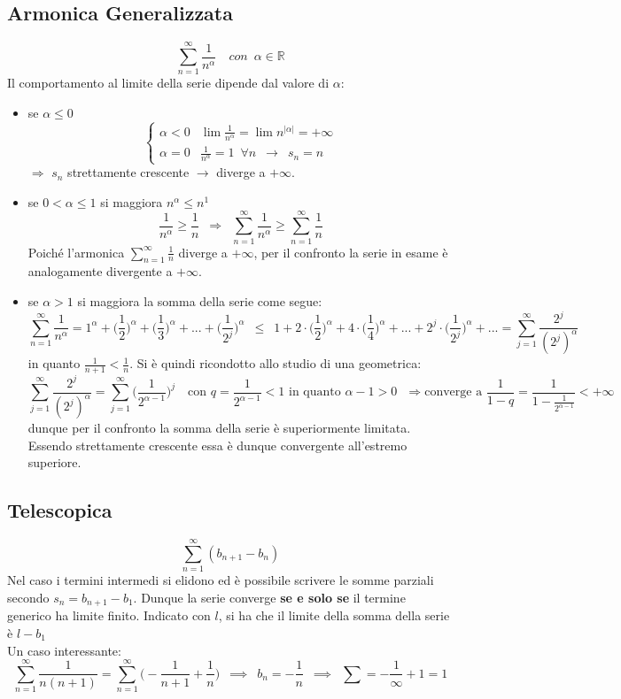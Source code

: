 \documentclass[10pt, oneside]{book}
\theoremstyle{plain}
\begin{document}
\subsection{Armonica Generalizzata}
\[\sum \limits_{n=1}^{\infty} \frac{1}{n^\alpha} \quad con \enspace \alpha \in \mathbb{R}\]
Il comportamento al limite della serie dipende dal valore di $\alpha$:
\begin{itemize}[label=$\ast$]
    \item se $\alpha \leq 0$\\
    \[\begin{cases}
        \alpha < 0 & \lim \frac{1}{n^\alpha} = \lim n^{|\alpha|} = + \infty \\
        \alpha = 0 & \frac{1}{n^\alpha} = 1 \enspace \forall n \enspace \rightarrow \enspace s_n = n
    \end{cases}
    \]
    $\Rightarrow$ $s_n$ strettamente crescente $\rightarrow$ diverge a $+ \infty$.
    \item se $0 < \alpha \leq 1$ si maggiora $n^\alpha \leq n^1$
    \[\frac{1}{n^\alpha} \geq \frac{1}{n} \enspace \Rightarrow \enspace \sum \limits_{n=1}^{\infty} \frac{1}{n^\alpha} \geq \sum \limits_{n=1}^{\infty} \frac{1}{n}\]
    Poiché l'armonica $\sum_{n=1}^{\infty} \frac{1}{n}$ diverge a $+ \infty$, per il confronto la serie in esame è analogamente divergente a $+\infty$.
    \item se $\alpha > 1$ si maggiora la somma della serie come segue:
    \[\sum \limits_{n=1}^{\infty} \frac{1}{n^\alpha} = 1^\alpha + \bigg(\frac{1}{2}\bigg)^\alpha + \bigg(\frac{1}{3}\bigg)^\alpha + ... + \bigg(\frac{1}{2^j}\bigg)^\alpha \enspace \leq \enspace 1+ 2\cdot \bigg(\frac{1}{2}\bigg)^\alpha + 4\cdot \bigg(\frac{1}{4}\bigg)^\alpha + ... + 2^j\cdot \bigg(\frac{1}{2^j}\bigg)^\alpha + ... = \sum \limits_{j=1}^{\infty} \frac{2^j}{(2^j)^\alpha}\]
    in quanto $\frac{1}{n+1} < \frac{1}{n}$. Si è quindi ricondotto allo studio di una geometrica:
    \[\sum \limits_{j=1}^{\infty} \frac{2^j}{(2^j)^\alpha} = \sum \limits_{j=1}^{\infty} \bigg(\frac{1}{2^{\alpha-1}}\bigg)^j \quad \textrm{con $q = \frac{1}{2^{\alpha-1}} < 1$ in quanto $\alpha - 1 > 0$ } \Rightarrow \textrm{converge a } \frac{1}{1-q} = \frac{1}{1 - \frac{1}{2^{\alpha-1}}} < + \infty\]
    dunque per il confronto la somma della serie è superiormente limitata. Essendo strettamente crescente essa è dunque convergente all'estremo superiore.
\end{itemize}

\subsection{Telescopica}
\[\sum \limits_{n=1}^{\infty} (b_{n+1} - b_n)\]
Nel caso i termini intermedi si elidono ed è possibile scrivere le somme parziali secondo $s_n = b_{n+1} - b_1$. Dunque la serie converge \textbf{se e solo se} il termine generico ha limite finito. Indicato con $l$, si ha che il limite della somma della serie è $l - b_1$
\\Un caso interessante:
\[\sum \limits_{n=1}^{\infty} \frac{1}{n (n+1)} = \sum \limits_{n=1}^{\infty} \bigg(-\frac{1}{n+1} + \frac{1}{n}\bigg) \enspace \implies \enspace b_n = - \frac{1}{n} \enspace \implies \enspace \sum = - \frac{1}{\infty} + 1 = 1\]
\end{document}

